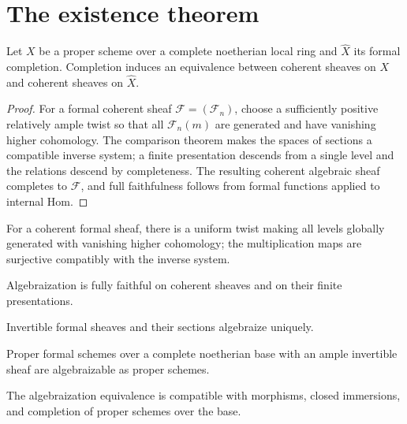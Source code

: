 \section{The existence theorem}
\begin{theorem}\label{fga-thm-8-4-2}
Let $X$ be a proper scheme over a complete noetherian local ring and
$\widehat X$ its formal completion.  Completion induces an equivalence between
coherent sheaves on $X$ and coherent sheaves on $\widehat X$.
\end{theorem}
\begin{proof}
For a formal coherent sheaf $\mathcal F=(\mathcal F_n)$, choose a sufficiently
positive relatively ample twist so that all $\mathcal F_n(m)$ are generated
and have vanishing higher cohomology.  The comparison theorem makes the spaces
of sections a compatible inverse system; a finite presentation descends from a
single level and the relations descend by completeness.  The resulting coherent
algebraic sheaf completes to $\mathcal F$, and full faithfulness follows from
formal functions applied to internal Hom.
\end{proof}
\begin{lemma}\label{fga-lem-8-4-3-1}
For a coherent formal sheaf, there is a uniform twist making all levels globally
generated with vanishing higher cohomology; the multiplication maps are
surjective compatibly with the inverse system.
\end{lemma}
\begin{corollary}\label{fga-cor-8-4-5}
Algebraization is fully faithful on coherent sheaves and on their finite
presentations.
\end{corollary}
\begin{corollary}\label{fga-cor-8-4-6}
Invertible formal sheaves and their sections algebraize uniquely.
\end{corollary}
\begin{corollary}\label{fga-cor-8-4-7}
Proper formal schemes over a complete noetherian base with an ample invertible
sheaf are algebraizable as proper schemes.
\end{corollary}
\begin{theorem}\label{fga-thm-8-4-10}
The algebraization equivalence is compatible with morphisms, closed immersions,
and completion of proper schemes over the base.
\end{theorem}


